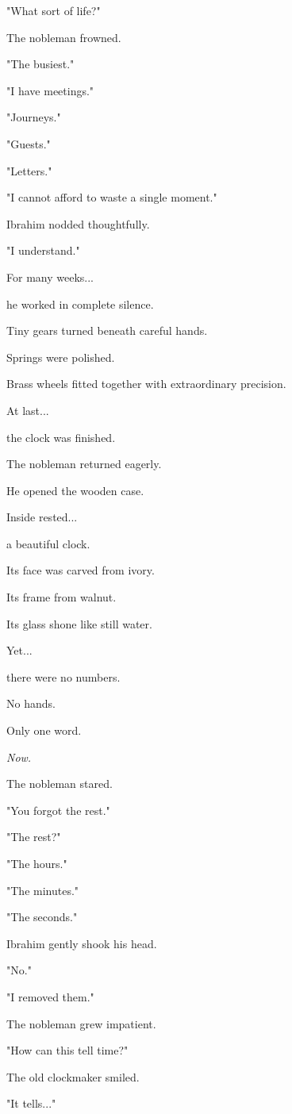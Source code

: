 \documentclass[12pt,openany]{book}
\begin{document}
"What sort of life?"

The nobleman frowned.

"The busiest."

"I have meetings."

"Journeys."

"Guests."

"Letters."

"I cannot afford to waste a single moment."

Ibrahim nodded thoughtfully.

"I understand."

For many weeks...

he worked in complete silence.

Tiny gears turned beneath careful hands.

Springs were polished.

Brass wheels fitted together with extraordinary precision.

At last...

the clock was finished.

The nobleman returned eagerly.

He opened the wooden case.

Inside rested...

a beautiful clock.

Its face was carved from ivory.

Its frame from walnut.

Its glass shone like still water.

Yet...

there were no numbers.

No hands.

Only one word.

\emph{Now.}

The nobleman stared.

"You forgot the rest."

"The rest?"

"The hours."

"The minutes."

"The seconds."

Ibrahim gently shook his head.

"No."

"I removed them."

The nobleman grew impatient.

"How can this tell time?"

The old clockmaker smiled.

"It tells..."
\end{document}
